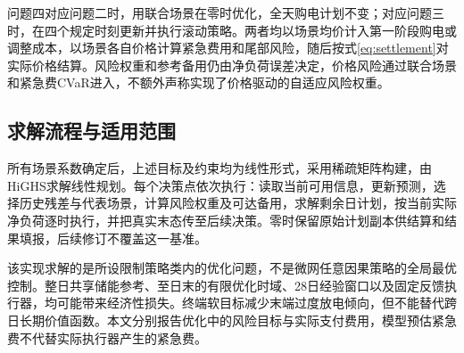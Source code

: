 问题四对应问题二时，用联合场景在零时优化，全天购电计划不变；对应问题三时，在四个规定时刻更新并执行滚动策略。两者均以场景均价计入第一阶段购电或调整成本，以场景各自价格计算紧急费用和尾部风险，随后按式\eqref{eq:settlement}对实际价格结算。风险权重和参考备用仍由净负荷误差决定，价格风险通过联合场景和紧急费CVaR进入，不额外声称实现了价格驱动的自适应风险权重。

\subsection{求解流程与适用范围}

所有场景系数确定后，上述目标及约束均为线性形式，采用稀疏矩阵构建，由HiGHS求解线性规划。每个决策点依次执行：读取当前可用信息，更新预测，选择历史残差与代表场景，计算风险权重及可达备用，求解剩余日计划，按当前实际净负荷逐时执行，并把真实末态传至后续决策。零时保留原始计划副本供结算和结果填报，后续修订不覆盖这一基准。

该实现求解的是所设限制策略类内的优化问题，不是微网任意因果策略的全局最优控制。整日共享储能参考、至日末的有限优化时域、28日经验窗口以及固定反馈执行器，均可能带来经济性损失。终端软目标减少末端过度放电倾向，但不能替代跨日长期价值函数。本文分别报告优化中的风险目标与实际支付费用，模型预估紧急费不代替实际执行器产生的紧急费。
